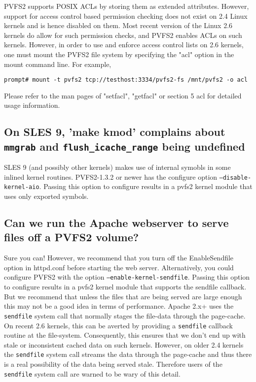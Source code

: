 \documentclass[11pt,letterpaper]{article}
\begin{document}
PVFS2 supports POSIX ACLs by storing them as extended attributes. However, support
for access control based permission checking does not exist on 2.4 Linux kernels and is hence disabled on them.
Most recent version of the Linux 2.6 kernels do allow for such permission checks, and PVFS2 enables
ACLs on such kernels.
However, in order to use and enforce access control lists on 2.6 kernels, one must mount
the PVFS2 file system by specifying the "acl" option in the mount command line. For example,
\begin{verbatim}
prompt# mount -t pvfs2 tcp://testhost:3334/pvfs2-fs /mnt/pvfs2 -o acl
\end{verbatim}
Please refer to the man pages of "setfacl", "getfacl" or section 5 acl for detailed usage
information.

\subsection{On SLES 9, 'make kmod' complains about \texttt{mmgrab} and
 \texttt{flush\_icache\_range} being undefined}

SLES 9 (and possibly other kernels) makes use of internal symobls in some
inlined kernel routines.  PVFS2-1.3.2 or newer has the configure option
\texttt{--disable-kernel-aio}.  Passing this option to configure results in a pvfs2
kernel module that uses only exported symbols.  

\subsection{Can we run the Apache webserver to serve files off a PVFS2 volume?}

Sure you can! However, we recommend that you turn off the EnableSendfile option in
httpd.conf before starting the web server. Alternatively, you could configure
PVFS2 with the option \texttt{--enable-kernel-sendfile}. Passing this option
to configure results in a pvfs2 kernel module that supports the sendfile
callback.
But we recommend that unless the files that are being served are large enough
this may not be a good idea in terms of performance. Apache 2.x+ uses the {\tt sendfile}
system call that normally stages the file-data through the page-cache. On recent 2.6 kernels,
this can be averted by providing a {\tt sendfile} callback routine at the file-system.
Consequently, this ensures that we don't end up with stale or inconsistent cached data on such
kernels. However, on older 2.4 kernels the {\tt sendfile} system call streams the data through
the page-cache and thus there is a real possibility of the data being served stale.
Therefore users of the {\tt sendfile} system call are warned to be wary of this detail.
\end{document}
